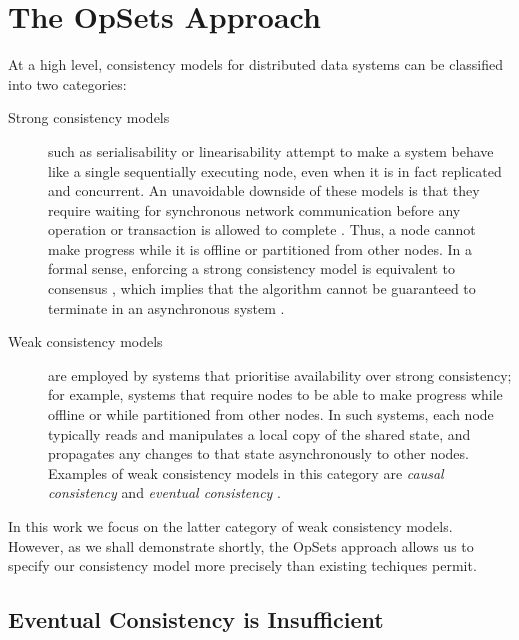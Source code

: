 \section{The OpSets Approach}\label{sec:approach}

At a high level, consistency models for distributed data systems can be classified into two categories:
\begin{description}
\item[Strong consistency models] such as serialisability or linearisability \cite{Herlihy:1990jq} attempt to make a system behave like a single sequentially executing node, even when it is in fact replicated and concurrent.
An unavoidable downside of these models is that they require waiting for synchronous network communication before any operation or transaction is allowed to complete \cite{Davidson:1985hv,Gilbert:2002il}.
Thus, a node cannot make progress while it is offline or partitioned from other nodes.
In a formal sense, enforcing a strong consistency model is equivalent to consensus \cite{Chandra:1996cp,Herlihy:1991gk}, which implies that the algorithm cannot be guaranteed to terminate in an asynchronous system \cite{Fischer:1985tt}.

\item[Weak consistency models] are employed by systems that prioritise availability over strong consistency; for example, systems that require nodes to be able to make progress while offline or while partitioned from other nodes.
In such systems, each node typically reads and manipulates a local copy of the shared state, and propagates any changes to that state asynchronously to other nodes.
Examples of weak consistency models in this category are \emph{causal consistency} \cite{Attiya:2015dm,Mahajan:2011wz,Lloyd:2011hz} and \emph{eventual consistency} \cite{Bailis:2013jc,Burckhardt:2014hy,Terry:1994fp,Vogels:2009ca}.
\end{description}

In this work we focus on the latter category of weak consistency models.
However, as we shall demonstrate shortly, the OpSets approach allows us to specify our consistency model more precisely than existing techiques permit.

\subsection{Eventual Consistency is Insufficient}\label{sec:eventual-consistency}

